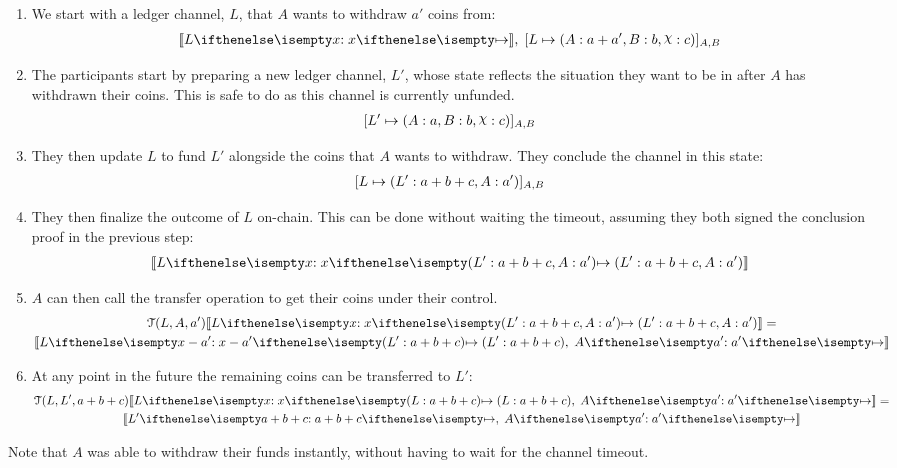 \begin{enumerate}
  \item We start with a ledger channel, $L$, that $A$ wants to withdraw $a'$ coins from:
  \begin{align}
    \adj{\holds{L}{x}{}}, \; \finalizable{L}{\alloc{A: a + a', B: b, \rchi: c}}{A, B}
  \end{align}
  \item The participants start by preparing a new ledger channel, $L'$, whose state reflects the situation they want to be in after $A$ has withdrawn their coins. This is safe to do as this channel is currently unfunded.
  \begin{align}
    \finalizable{L'}{\alloc{A: a, B:b, \rchi: c}}{A,B}
  \end{align}
  \item They then update $L$ to fund $L'$ alongside the coins that $A$ wants to withdraw. They conclude the channel in this state:
  \begin{align}
    [L \mapsto ( L': a + b + c, A: a' )]_{A,B}
  \end{align}
  \item They then finalize the outcome of $L$ on-chain. This can be done without waiting the timeout, assuming they both signed the conclusion proof in the previous step:
  \begin{align}
    \adj{\holds{L}{x}{\alloc{L': a + b + c, A: a'}}}
  \end{align}
  \item $A$ can then call the transfer operation to get their coins under their control. 
  \begin{multline}
    \transfer{L}{A}{a'}\adj{\holds{L}{x}{\alloc{L': a + b + c, A: a'}}} = \\ \adj{\holds{L}{x - a'}{\alloc{L': a + b + c}}, \; \holds{A}{a'}{}}
  \end{multline}
  \item At any point in the future the remaining coins can be transferred to $L'$:
  \begin{multline}
    \transfer{L}{L'}{a + b + c}\adj{\holds{L}{x}{\alloc{L: a + b + c}}, \; \holds{A}{a'}{}} =  \\ \adj{\holds{L'}{a + b + c}{}, \; \holds{A}{a'}{}}
  \end{multline}
\end{enumerate}
Note that $A$ was able to withdraw their funds instantly, without having to wait for the channel timeout.
